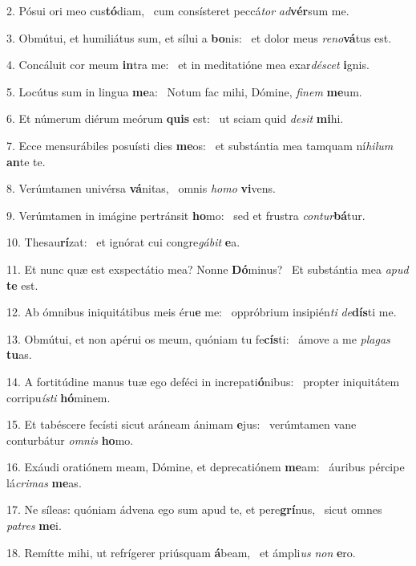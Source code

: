 2. Pósui ori meo cus\textbf{tó}diam, \ast\  cum consísteret peccá\textit{tor} \textit{ad}\textbf{vér}sum me.\

3. Obmútui, et humiliátus sum, et sílui a \textbf{bo}nis: \ast\  et dolor meus \textit{re}\textit{no}\textbf{vá}tus est.\

4. Concáluit cor meum \textbf{in}tra me: \ast\  et in meditatióne mea exar\textit{dé}\textit{scet} \textbf{i}gnis.\

5. Locútus sum in lingua \textbf{me}a: \ast\  Notum fac mihi, Dómine, \textit{fi}\textit{nem} \textbf{me}um.\

6. Et númerum diérum meórum \textbf{quis} est: \ast\  ut sciam quid \textit{de}\textit{sit} \textbf{mi}hi.\

7. Ecce mensurábiles posuísti dies \textbf{me}os: \ast\  et substántia mea tamquam ní\textit{hi}\textit{lum} \textbf{an}te te.\

8. Verúmtamen univérsa \textbf{vá}nitas, \ast\  omnis \textit{ho}\textit{mo} \textbf{vi}vens.\

9. Verúmtamen in imágine pertránsit \textbf{ho}mo: \ast\  sed et frustra \textit{con}\textit{tur}\textbf{bá}tur.\

10. Thesau\textbf{rí}zat: \ast\  et ignórat cui congre\textit{gá}\textit{bit} \textbf{e}a.\

11. Et nunc quæ est exspectátio mea? Nonne \textbf{Dó}minus? \ast\  Et substántia mea \textit{a}\textit{pud} \textbf{te} est.\

12. Ab ómnibus iniquitátibus meis éru\textbf{e} me: \ast\  oppróbrium insipién\textit{ti} \textit{de}\textbf{dís}ti me.\

13. Obmútui, et non apérui os meum, quóniam tu fe\textbf{cís}ti: \ast\  ámove a me \textit{pla}\textit{gas} \textbf{tu}as.\

14. A fortitúdine manus tuæ ego deféci in increpati\textbf{ó}nibus: \ast\  propter iniquitátem corripu\textit{ís}\textit{ti} \textbf{hó}minem.\

15. Et tabéscere fecísti sicut aráneam ánimam \textbf{e}jus: \ast\  verúmtamen vane conturbátur \textit{om}\textit{nis} \textbf{ho}mo.\

16. Exáudi oratiónem meam, Dómine, et deprecatiónem \textbf{me}am: \ast\  áuribus pércipe lá\textit{cri}\textit{mas} \textbf{me}as.\

17. Ne síleas: quóniam ádvena ego sum apud te, et pere\textbf{grí}nus, \ast\  sicut omnes \textit{pa}\textit{tres} \textbf{me}i.\

18. Remítte mihi, ut refrígerer priúsquam \textbf{á}beam, \ast\  et ámpli\textit{us} \textit{non} \textbf{e}ro.\

